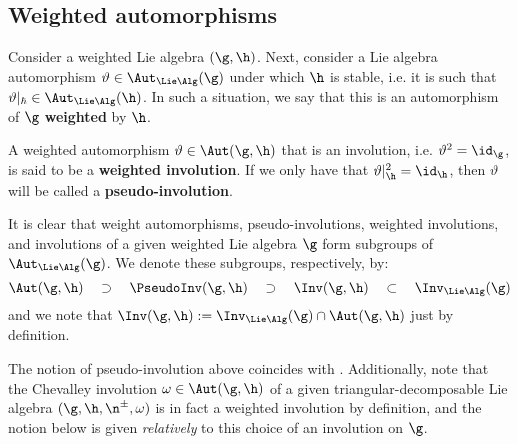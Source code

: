     \subsection{Weighted automorphisms}
        \begin{definition} \label{def: weighted_automorphisms_of_weighted_lie_algebras}
            Consider a weighted Lie algebra $(\g, \h)$. Next, consider a Lie algebra automorphism $\vartheta \in \Aut_{\Lie\Alg}(\g)$ under which $\h$ is stable, i.e. it is such that $\vartheta|_{\hbar} \in \Aut_{\Lie\Alg}(\h)$. In such a situation, we say that this is an automorphism of $\g$ \textbf{weighted} by $\h$.
            
            A weighted automorphism $\vartheta \in \Aut(\g, \h)$ that is an involution, i.e. $\vartheta^2 = \id_{\g}$, is said to be a \textbf{weighted involution}. If we only have that $\vartheta|_{\h}^2 = \id_{\h}$, then $\vartheta$ will be called a \textbf{pseudo-involution}. 
        \end{definition}
        It is clear that weight automorphisms, pseudo-involutions, weighted involutions, and involutions of a given weighted Lie algebra $\g$ form subgroups of $\Aut_{\Lie\Alg}(\g)$. We denote these subgroups, respectively, by:
            $$\Aut(\g, \h) \quad \supset \quad \PseudoInv(\g, \h) \quad \supset \quad \Inv(\g, \h) \quad \subset \quad \Inv_{\Lie\Alg}(\g)$$
        and we note that $\Inv(\g, \h) := \Inv_{\Lie\Alg}(\g) \cap \Aut(\g, \h)$ just by definition.
        \begin{remark}
            The notion of pseudo-involution above coincides with \cite[Definition 1.1]{regelskis_vlaar_kac_moody_pseudo_symmetric_pairs}. Additionally, note that the Chevalley involution $\omega \in \Aut(\g, \h)$ of a given triangular-decomposable Lie algebra $(\g, \h, \n^{\pm}, \omega)$ is in fact a weighted involution by definition, and the notion below is given \textit{relatively} to this choice of an involution on $\g$.
        \end{remark}
        
